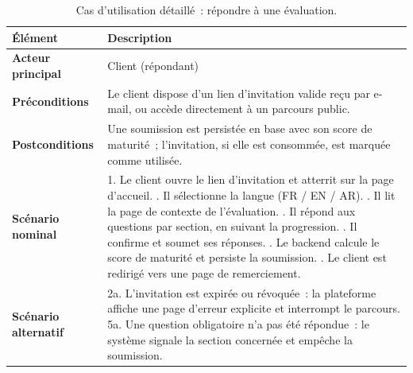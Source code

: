\documentclass[12pt,a4paper]{report}
\begin{document}
\begin{table}[H]
\centering
\caption{Cas d'utilisation détaillé~: répondre à une évaluation.}
\begin{tabularx}{\textwidth}{>{\bfseries}L{3.5cm}Y}
\toprule
Élément & Description \\
\midrule
Acteur principal & Client (répondant) \\
Préconditions & Le client dispose d'un lien d'invitation valide reçu par e-mail, ou accède directement à un parcours public. \\
Postconditions & Une soumission est persistée en base avec son score de maturité~; l'invitation, si elle est consommée, est marquée comme utilisée. \\
Scénario nominal &
1. Le client ouvre le lien d'invitation et atterrit sur la page d'accueil. . Il sélectionne la langue (FR / EN / AR). . Il lit la page de contexte de l'évaluation. . Il répond aux questions par section, en suivant la progression. . Il confirme et soumet ses réponses. . Le backend calcule le score de maturité et persiste la soumission. . Le client est redirigé vers une page de remerciement. \\
Scénario alternatif &
2a. L'invitation est expirée ou révoquée~: la plateforme affiche une page d'erreur explicite et interrompt le parcours. \newline
5a. Une question obligatoire n'a pas été répondue~: le système signale la section concernée et empêche la soumission. \\
\bottomrule
\end{tabularx}
\label{tab:uc-respond}
\end{table}
\end{document}

